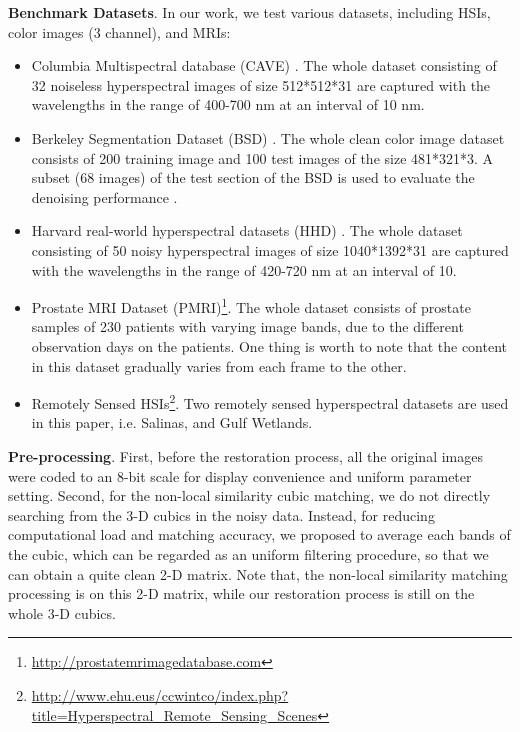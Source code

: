 \documentclass[twocolumn]{svjour3}          %
\begin{document}
    \noindent
    \textbf{Benchmark Datasets}. In our work, we test various datasets, including HSIs, color images (3 channel), and MRIs:

    \begin{itemize}
    \item Columbia Multispectral database (CAVE) \cite{yasuma2010generalized}. The whole dataset consisting of 32 noiseless hyperspectral images of size 512*512*31 are captured with the wavelengths in the range of 400-700 nm at an interval of 10 nm.
    \item Berkeley Segmentation Dataset (BSD) \cite{martin2001a}. The whole clean color image dataset consists of 200 training image and 100 test images of the size 481*321*3. A subset (68 images) of the test section of the BSD is used to evaluate the denoising performance \cite{roth2005fields}.
    \item Harvard real-world hyperspectral datasets (HHD) \cite{chakrabarti2011statistics}. The whole dataset consisting of 50 noisy hyperspectral images of size 1040*1392*31 are captured with the wavelengths in the range of 420-720 nm at an interval of 10.
    \item Prostate MRI Dataset (PMRI)\footnote{\url{http://prostatemrimagedatabase.com}}. The whole dataset consists of prostate samples of 230 patients with varying image bands, due to the different observation days on the patients. One thing is worth to note that the content in this dataset gradually varies from each frame to the other.
    \item Remotely Sensed HSIs\footnote{\url{http://www.ehu.eus/ccwintco/index.php?title=Hyperspectral_Remote_Sensing_Scenes}}. Two remotely sensed hyperspectral datasets are used in this paper, i.e. Salinas, and Gulf Wetlands.
    \end{itemize}

    \noindent
    \textbf{Pre-processing}. First, before the restoration process, all the original images were coded to an 8-bit scale for display convenience and uniform parameter setting. Second, for the non-local similarity cubic matching, we do not directly searching from the 3-D cubics in the noisy data. Instead, for reducing computational load and matching accuracy, we proposed to average each bands of the cubic, which can be regarded as an uniform filtering procedure, so that we can obtain a quite clean 2-D matrix. Note that, the non-local similarity matching processing is on this 2-D matrix, while our restoration process is still on the whole 3-D cubics.
\end{document}
